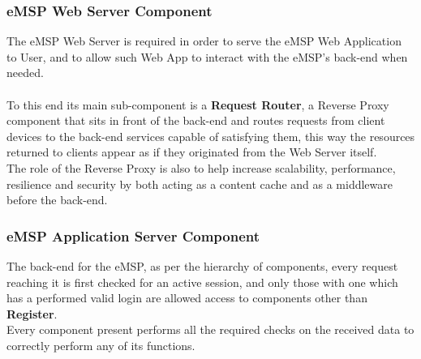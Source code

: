 \documentclass[11pt]{article}
\begin{document}
\subsubsection{eMSP Web Server Component}

The eMSP Web Server is required in order to serve the eMSP Web Application to User, and to allow such Web App to interact with the eMSP's back-end when needed. \\
\\
To this end its main sub-component is a \textbf{Request Router}, a Reverse Proxy component that sits in front of the back-end and routes requests from client devices to the back-end services capable of satisfying them, this way the resources returned to clients appear as if they originated from the Web Server itself. \\
The role of the Reverse Proxy is also to help increase scalability, performance, resilience and security by both acting as a content cache and as a middleware before the back-end. 

\subsubsection{eMSP Application Server Component}

The back-end for the eMSP, as per the hierarchy of components, every request reaching it is first checked for an active session, and only those with one which has a performed valid login are allowed access to components other than \textbf{Register}. \\
Every component present performs all the required checks on the received data to correctly perform any of its functions.
\end{document}
